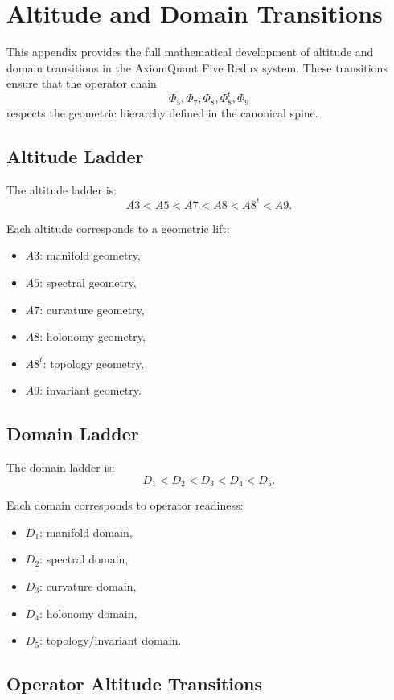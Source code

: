 \section{Altitude and Domain Transitions}
\label{sec:altitudetransitions}

This appendix provides the full mathematical development of altitude and domain
transitions in the AxiomQuant Five Redux system. These transitions ensure that
the operator chain
\[
\Phi_5, \Phi_7, \Phi_8, \Phi_8^t, \Phi_9
\]
respects the geometric hierarchy defined in the canonical spine.

\subsection{Altitude Ladder}

The altitude ladder is:
\[
A3 < A5 < A7 < A8 < A8^t < A9.
\]

Each altitude corresponds to a geometric lift:

\begin{itemize}
    \item $A3$: manifold geometry,
    \item $A5$: spectral geometry,
    \item $A7$: curvature geometry,
    \item $A8$: holonomy geometry,
    \item $A8^t$: topology geometry,
    \item $A9$: invariant geometry.
\end{itemize}

\subsection{Domain Ladder}

The domain ladder is:
\[
D_1 < D_2 < D_3 < D_4 < D_5.
\]

Each domain corresponds to operator readiness:

\begin{itemize}
    \item $D_1$: manifold domain,
    \item $D_2$: spectral domain,
    \item $D_3$: curvature domain,
    \item $D_4$: holonomy domain,
    \item $D_5$: topology/invariant domain.
\end{itemize}

\subsection{Operator Altitude Transitions}

